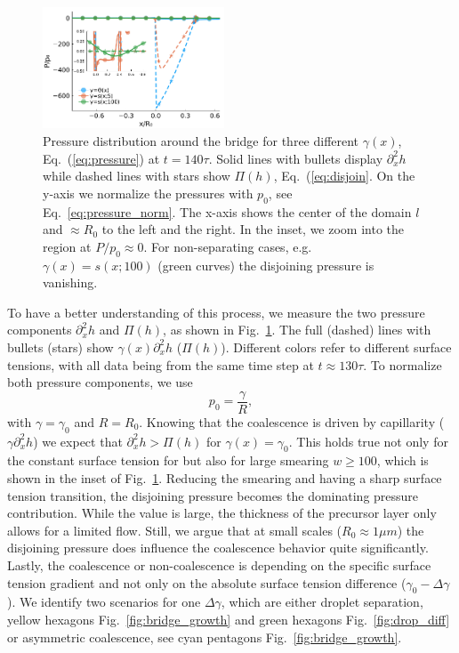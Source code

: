 \documentclass[twocolumn,amsmath,amssymb,showpacs,nofootinbib,prfluids,superscriptaddress]{revtex4-2} %
\begin{document}
\begin{figure}
    \centering
    \includegraphics[width=0.48\textwidth]{Figures/pressures_three_gam_end.pdf}
    \caption{Pressure distribution around the bridge for three different $\gamma(x)$, Eq.~(\ref{eq:pressure}) at $t=140\tau$.
    Solid lines with bullets display $\partial_x^2 h$ while dashed lines with stars show $\Pi(h)$, Eq.~(\ref{eq:disjoin}.
    On the y-axis we normalize the pressures with $p_0$, see Eq.~\ref{eq:pressure_norm}.
    The x-axis shows the center of the domain $l$ and $\approx R_0$ to the left and the right.
    In the inset, we zoom into the region at $P/p_0 \approx 0$. 
    For non-separating cases, e.g. $\gamma(x) = s(x;100)$ (green curves) the disjoining pressure is vanishing.}
    \label{fig:pressures}
\end{figure}
To have a better understanding of this process, we measure the two pressure components $\partial_x^2 h$ and $\Pi(h)$, as shown in Fig.~\ref{fig:pressures}.
The full (dashed) lines with bullets (stars) show $\gamma(x)\partial_x^2 h$ ($\Pi(h)$). 
Different colors refer to different surface tensions, with all data being from the same time step at $t\approx 130\tau$.
To normalize both pressure components, we use 
\begin{equation}\label{eq:pressure_norm}
    p_0 = \frac{\gamma}{R},
\end{equation}
with $\gamma = \gamma_0$ and $R = R_0$.
Knowing that the coalescence is driven by capillarity ($\gamma\partial_x^2 h$) we expect that $\partial_x^2 h > \Pi(h)$ for $\gamma(x) = \gamma_0$.
This holds true not only for the constant surface tension for but also for large smearing $w\ge 100$, which is shown in the inset of Fig.~\ref{fig:pressures}.
Reducing the smearing and having a sharp surface tension transition, the disjoining pressure becomes the dominating pressure contribution.
While the value is large, the thickness of the precursor layer only allows for a limited flow. 
Still, we argue that at small scales ($R_0 \approx 1\mu m$) the disjoining pressure does influence the coalescence behavior quite significantly.
Lastly, the coalescence or non-coalescence is depending on the specific surface tension gradient and not only on the absolute surface tension difference ($\gamma_0-\Delta\gamma$).
We identify two scenarios for one $\Delta\gamma$, which are either droplet separation, yellow hexagons Fig.~\ref{fig:bridge_growth} and green hexagons Fig.~\ref{fig:drop_diff} or asymmetric coalescence, see cyan pentagons Fig.~\ref{fig:bridge_growth}.
\end{document}
